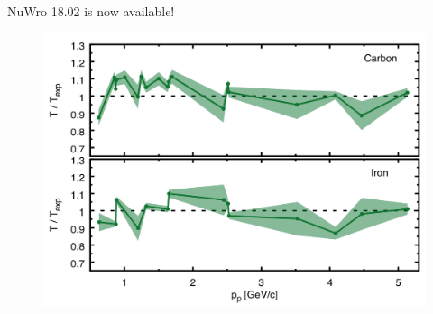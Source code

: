 \documentclass{article}
\date{FEBRUARY 26, 2018}
\begin{document}
\maketitle

\begin{center}
  {\vspace{20pt}\sc\huge NuWro 18.02 is now available!\vspace{10pt}}
\end{center}

\begin{figure}[ht]
  \centering
  \includegraphics[width=0.5\linewidth]{img/1802_transparency.png}
\end{figure}
\end{document}
